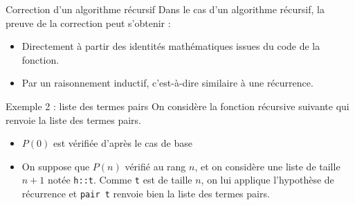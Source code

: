 \documentclass[10pt]{beamer}
\begin{document}
\begin{frame}[fragile]{\Ctitle}{\stitle}
    \begin{block}{Correction d'un algorithme récursif}
        Dans le cas d'un algorithme récursif, la preuve de la correction peut s'obtenir :
        \begin{itemize}
            \item<1-> Directement à partir des identités mathématiques issues du code de la fonction.
            \item<2-> Par un raisonnement inductif, c'est-à-dire similaire à une récurrence.
        \end{itemize}
    \end{block}
\end{frame}

\begin{frame}[fragile]{\Ctitle}{\stitle}
    \begin{exampleblock}{Exemple 2 : liste des termes pairs}
        {\small On considère la fonction récursive suivante qui renvoie la liste des termes pairs.}
        \begin{itemize}
            \item<5-> {\small $P(0)$ est vérifiée d'après le cas de base}
            \item<6-> {\small On suppose que $P(n)$ vérifié au rang $n$, et on considère une liste de taille $n+1$ notée {\tt h::t}. Comme  {\tt t} est de taille $n$, on lui applique l'hypothèse de récurrence et {\tt pair t} renvoie bien la liste des termes pairs.}
        \end{itemize}
    \end{exampleblock}
\end{frame}
\end{document}
